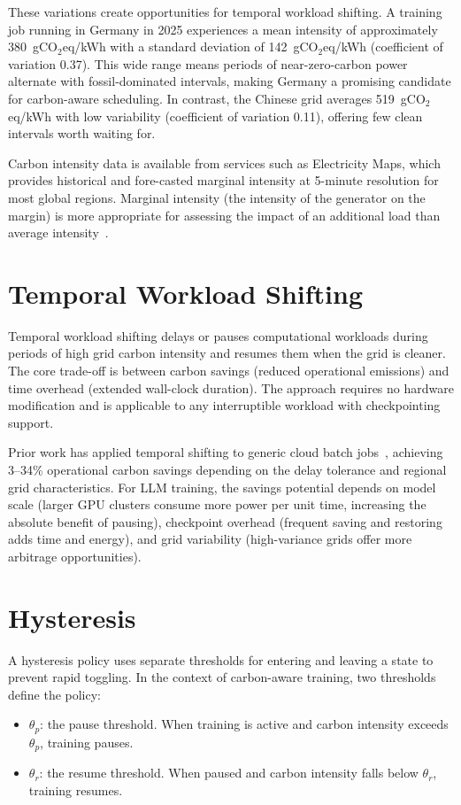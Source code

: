 These variations create opportunities for temporal workload shifting.  A
training job running in Germany in 2025 experiences a mean intensity of
approximately 380~gCO$_2$eq/kWh with a standard deviation of 142~gCO$_2$eq/kWh
(coefficient of variation 0.37).  This wide range means periods of
near-zero-carbon power alternate with fossil-dominated intervals, making
Germany a promising candidate for carbon-aware scheduling.  In contrast, the
Chinese grid averages 519~gCO$_2$eq/kWh with low variability (coefficient of variation 0.11),
offering few clean intervals worth waiting for.

Carbon intensity data is available from services such as Electricity Maps,
which provides historical and fore-casted marginal intensity at 5-minute
resolution for most global regions.  Marginal intensity (the intensity of the
generator on the margin) is more appropriate for assessing the impact of an
additional load than average intensity~\cite{dodge_measuring_2022}.

\section{Temporal Workload Shifting}
\label{sec:temporal-workload-shifting}

Temporal workload shifting delays or pauses computational workloads during
periods of high grid carbon intensity and resumes them when the grid is
cleaner.  The core trade-off is between carbon savings (reduced operational
emissions) and time overhead (extended wall-clock duration).  The approach
requires no hardware modification and is applicable to any interruptible
workload with checkpointing support.

Prior work has applied temporal shifting to generic cloud batch
jobs~\cite{wiesner_lets_2021}, achieving 3--34\% operational carbon savings
depending on the delay tolerance and regional grid characteristics.  For LLM
training, the savings potential depends on model scale (larger GPU clusters
consume more power per unit time, increasing the absolute benefit of pausing),
checkpoint overhead (frequent saving and restoring adds time and energy), and
grid variability (high-variance grids offer more arbitrage opportunities).

\section{Hysteresis}
\label{sec:hysteresis}

A hysteresis policy uses separate thresholds for entering and leaving a state
to prevent rapid toggling.  In the context of carbon-aware training, two
thresholds define the policy:
\begin{itemize}
  \item $\theta_p$: the pause threshold.  When training is active and carbon
    intensity exceeds $\theta_p$, training pauses.
  \item $\theta_r$: the resume threshold.  When paused and carbon intensity
    falls below $\theta_r$, training resumes.
\end{itemize}


